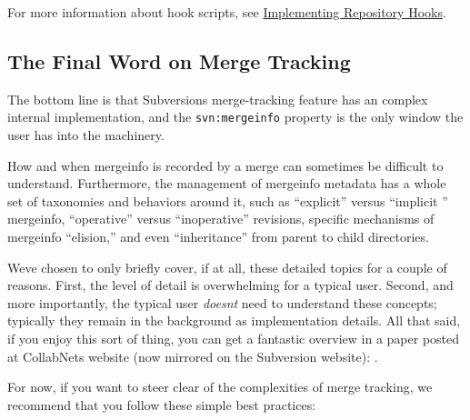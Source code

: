 For more information about hook scripts, see
\hyperref[svn.reposadmin.hooks]{Implementing Repository Hooks}.

\subsection{The Final Word on Merge
Tracking}\label{svn.branchmerge.advanced.finalword}

The bottom line is that Subversion\textquotesingle s merge-tracking
feature has an complex internal implementation, and the
\texttt{svn:mergeinfo} property is the only window the user has into the
machinery.

How and when mergeinfo is recorded by a merge can sometimes be difficult
to understand. Furthermore, the management of mergeinfo metadata has a
whole set of taxonomies and behaviors around it, such as ``explicit''
versus ``implicit '' mergeinfo, ``operative'' versus ``inoperative''
revisions, specific mechanisms of mergeinfo ``elision,'' and even
``inheritance'' from parent to child directories.

We\textquotesingle ve chosen to only briefly cover, if at all, these
detailed topics for a couple of reasons. First, the level of detail is
overwhelming for a typical user. Second, and more importantly, the
typical user \emph{doesn\textquotesingle t} need to understand these
concepts; typically they remain in the background as implementation
details. All that said, if you enjoy this sort of thing, you can get a
fantastic overview in a paper posted at CollabNet\textquotesingle s
website (now mirrored on the Subversion website):
\href{https://subversion.apache.org/blog/2008-05-06-merge-info.html}{}.

For now, if you want to steer clear of the complexities of merge
tracking, we recommend that you follow these simple best practices:

